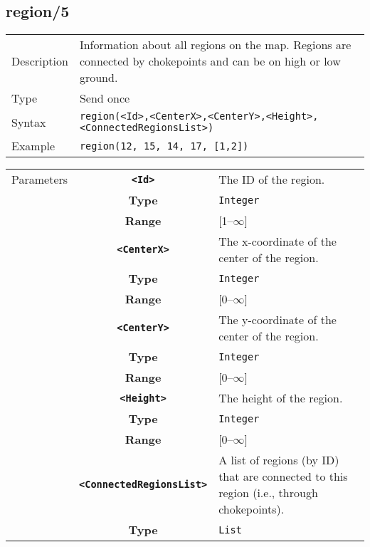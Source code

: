 \subsection{region/5}
\begin{tabularx}{\textwidth}{lX}
 Description & Information about all regions on the map. Regions are connected by chokepoints and can be on high or low ground. \\
 Type & Send once \\
 Syntax & \verb|region(<Id>,<CenterX>,<CenterY>,<Height>,<ConnectedRegionsList>)| \\
 Example & \verb|region(12, 15, 14, 17, [1,2])| \\
 \end{tabularx}
 \begin{tabularx}{\textwidth}{l | c | p{8cm}|}
 \cline{2-3}
 Parameters & \textbf{\verb|<Id>|} & The ID of the region.\\
            & \textbf{Type} & \verb|Integer| \\
            & \textbf{Range} & [1--$\infty$] \\
            \cline{2-3}
            & \textbf{\verb|<CenterX>|} & The x-coordinate of the center of the region.\\
            & \textbf{Type} & \verb|Integer| \\
            & \textbf{Range} & [0--$\infty$] \\
            \cline{2-3}
            & \textbf{\verb|<CenterY>|} & The y-coordinate of the center of the region.\\
            & \textbf{Type} & \verb|Integer| \\
            & \textbf{Range} & [0--$\infty$] \\
            \cline{2-3}
            & \textbf{\verb|<Height>|} & The height of the region.\\
            & \textbf{Type} & \verb|Integer| \\
            & \textbf{Range} & [0--$\infty$] \\
            \cline{2-3}
            & \textbf{\verb|<ConnectedRegionsList>|} & A list of regions (by ID) that are connected to this region (i.e., through chokepoints).\\
            & \textbf{Type} & \verb|List| \\
            \cline{2-3}
\end{tabularx}

\newpage

